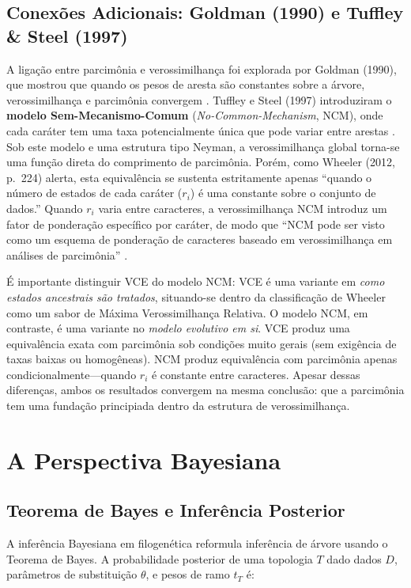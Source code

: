 \subsection{Conexões Adicionais: Goldman (1990) e Tuffley \& Steel (1997)}

A ligação entre parcimônia e verossimilhança foi explorada por Goldman (1990), que mostrou que quando os pesos de aresta são constantes sobre a árvore, verossimilhança e parcimônia convergem \parencite{goldman1990}. Tuffley e Steel (1997) introduziram o \textbf{modelo Sem-Mecanismo-Comum} (\textit{No-Common-Mechanism}, NCM), onde cada caráter tem uma taxa potencialmente única que pode variar entre arestas \parencite{tuffley1997}. Sob este modelo e uma estrutura tipo Neyman, a verossimilhança global torna-se uma função direta do comprimento de parcimônia. Porém, como Wheeler (2012, p.~224) alerta, esta equivalência se sustenta estritamente apenas ``quando o número de estados de cada caráter ($r_i$) é uma constante sobre o conjunto de dados.'' Quando $r_i$ varia entre caracteres, a verossimilhança NCM introduz um fator de ponderação específico por caráter, de modo que ``NCM pode ser visto como um esquema de ponderação de caracteres baseado em verossimilhança em análises de parcimônia'' \parencite{wheeler2012}.

É importante distinguir VCE do modelo NCM: VCE é uma variante em \textit{como estados ancestrais são tratados}, situando-se dentro da classificação de Wheeler como um sabor de Máxima Verossimilhança Relativa. O modelo NCM, em contraste, é uma variante no \textit{modelo evolutivo em si}. VCE produz uma equivalência exata com parcimônia sob condições muito gerais (sem exigência de taxas baixas ou homogêneas). NCM produz equivalência com parcimônia apenas condicionalmente---quando $r_i$ é constante entre caracteres. Apesar dessas diferenças, ambos os resultados convergem na mesma conclusão: que a parcimônia tem uma fundação principiada dentro da estrutura de verossimilhança.

\section{A Perspectiva Bayesiana}

\subsection{Teorema de Bayes e Inferência Posterior}

A inferência Bayesiana em filogenética reformula inferência de árvore usando o Teorema de Bayes. A probabilidade posterior de uma topologia $T$ dado dados $D$, parâmetros de substituição $\theta$, e pesos de ramo $t_T$ é:

